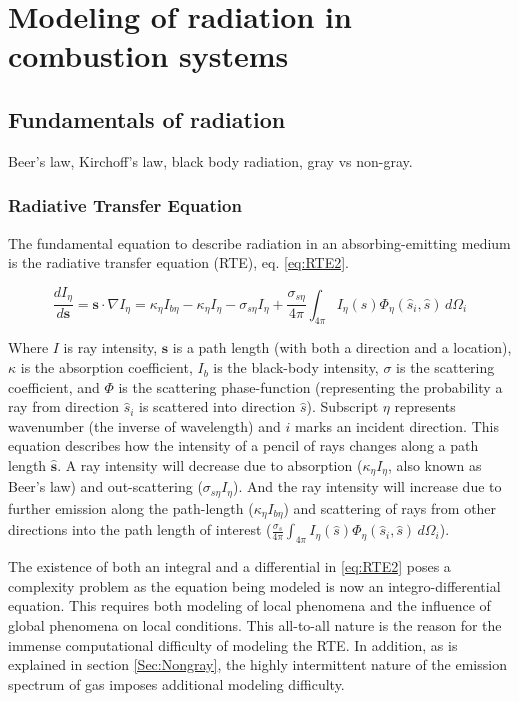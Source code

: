 \addchapheadtotoc
\chapter{Modeling of radiation in combustion systems}\label{chapter:models_and_methods}

\section{Fundamentals of radiation} \label{Sec:FundOfRad}
Beer's law, Kirchoff's law, black body radiation, gray vs non-gray.

\subsection{Radiative Transfer Equation}
The fundamental equation to describe radiation in an absorbing-emitting medium is the radiative transfer equation (RTE), eq. \ref{eq:RTE2}.

\begin{equation}
    \frac{dI_\eta{}}{d\textbf{s}} = \textbf{s} \cdot \nabla{I_\eta{}} = \kappa{}_\eta{}I_{b\eta{}}-\kappa{}_\eta{}I_\eta{}-\sigma{}_{s\eta{}}I_\eta{}+\frac{\sigma{}_{s\eta{}}}{4\pi}\int_{4\pi{}}{I_\eta{}(\hat{s})\Phi_\eta{}(\hat{s}_i,\hat{s})}\,d\Omega{}_i
    \label{eq:RTE2}
\end{equation}

Where $I$ is ray intensity, $\textbf{s}$ is a path length (with both a direction and a location), $\kappa{}$ is the absorption coefficient, $I_b$ is the black-body intensity, $\sigma{}$ is the scattering coefficient, and $\Phi{}$ is the scattering phase-function (representing the probability a ray from direction $\hat{s}_i$ is scattered into direction $\hat{s}$). Subscript $\eta{}$ represents wavenumber (the inverse of wavelength) and $i$ marks an incident direction. This equation describes how the intensity of a pencil of rays changes along a path length $\hat{\textbf{s}}$. A ray intensity will decrease due to absorption ($\kappa{}_\eta{}I_\eta{}$, also known as Beer's law) and out-scattering ($\sigma{}_{s\eta{}}I_\eta{}$). And the ray intensity will increase due to further emission along the path-length ($\kappa{}_\eta{}I_{b\eta{}}$) and scattering of rays from other directions into the path length of interest ($\frac{\sigma{}_s}{4\pi}\int_{4\pi{}}{I_\eta{}(\hat{s})\Phi_\eta{}(\hat{s}_i,\hat{s})}\,d\Omega{}_i$). 

The existence of both an integral and a differential in \ref{eq:RTE2} poses a complexity problem as the equation being modeled is now an integro-differential equation. 
This requires both modeling of local phenomena and the influence of global phenomena on local conditions. 
This all-to-all nature is the reason for the immense computational difficulty of modeling the RTE. 
In addition, as is explained in section \ref{Sec:Nongray}, the highly intermittent nature of the emission spectrum of gas imposes additional modeling difficulty.

